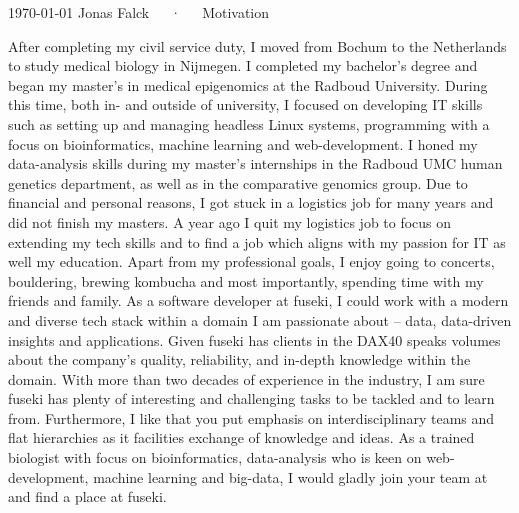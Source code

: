 \documentclass[11pt, a4paper]{awesome-cv}
\begin{document}
\makecvheader[R]

\makecvfooter
  {\today}
  {Jonas Falck~~~·~~~Motivation}
  {}

\makelettertitle
\begin{cvletter}

After completing my civil service duty, I moved from Bochum to the Netherlands to study medical biology in Nijmegen. 
I completed my bachelor’s degree and began my master's in medical epigenomics at the Radboud University. 
During this time, both in- and outside of university, I focused on developing IT skills such as setting up and managing headless Linux systems, programming with a focus on bioinformatics, machine learning and web-development. 
I honed my data-analysis skills during my master's internships in the Radboud UMC human genetics department, as well as in the comparative genomics group. 
Due to financial and personal reasons, I got stuck in a logistics job for many years and did not finish my masters.
A year ago I quit my logistics job to focus on extending my tech skills and to find a job which aligns with my passion for IT as well my education.
Apart from my professional goals, I enjoy going to concerts, bouldering, brewing kombucha and most importantly, spending time with my friends and family.
As a software developer at fuseki, I could work with a modern and diverse tech stack within a domain I am passionate about – data, data-driven insights and applications. 
Given fuseki has clients in the DAX40 speaks volumes about the company's quality, reliability, and in-depth knowledge within the domain.
With more than two decades of experience in the industry, I am sure fuseki has plenty of interesting and challenging tasks to be tackled and to learn from.
Furthermore, I like that you put emphasis on interdisciplinary teams and flat hierarchies as it facilities exchange of knowledge and ideas. 
As a trained biologist with focus on bioinformatics, data-analysis who is keen on web-development, machine learning and big-data, I would gladly join your team at and find a place at fuseki.

\end{cvletter}
\end{document}
